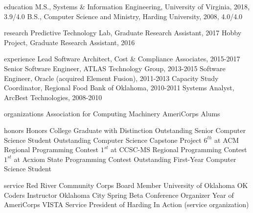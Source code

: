 \documentclass[11pt,article,oneside]{memoir}
\def\myname{Mark Rucker}
\begin{document}
	\noindent{\LARGE\scheader \textsc{\myname}}
	\bigskip

	\begin{cvsection}{education}
		\ind M.S., Systems \& Information Engineering, University of Virginia, 2018, 3.9/4.0
		\ind B.S., Computer Science and Ministry, Harding University, 2008, 4.0/4.0
	\end{cvsection}

	\begin{cvsection}{research}		
		\ind Predictive Technology Lab, Graduate Research Assistant, 2017
		\ind Hobby Project, Graduate Research Assistant, 2016
	\end{cvsection}
	
	\begin{cvsection}{experience}
		\ind Lead Software Architect, Cost \& Compliance Associates, 2015-2017
		\ind Senior Software Engineer, ATLAS Technology Group, 2013-2015
		\ind Software Engineer, Oracle (acquired Element Fusion), 2011-2013
		\ind Capacity Study Coordinator, Regional Food Bank of Oklahoma, 2010-2011
		\ind Systems Analyst, ArcBest Technologies, 2008-2010
	\end{cvsection}
	
	\begin{cvsection}{organizations}
		\ind Association for Computing Machinery
		\ind AmeriCorps Alums
	\end{cvsection}
	
	\begin{cvsection}{honors}
		\ind Honors College Graduate with Distinction
		\ind Outstanding Senior Computer Science Student
		\ind Outstanding Computer Science Capstone Project
		\ind $6^{th}$ at ACM Regional Programming Contest
		\ind $1^{st}$ at CCSC-MS Regional Programming Contest
		\ind $1^{st}$ at Acxiom State Programming Contest
		\ind Outstanding First-Year Computer Science Student
	\end{cvsection}

	\begin{cvsection}{service}
		\ind Red River Community Corps Board Member
		\ind University of Oklahoma OK Coders Instructor
		\ind Oklahoma City Spring Beta Conference Organizer
		\ind Year of AmeriCorps VISTA Service
		\ind President of Harding In Action (service organization)
	\end{cvsection}
\end{document}
